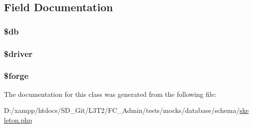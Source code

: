\subsection{Field Documentation}
\hypertarget{class_mock___database___schema___skeleton_a1fa3127fc82f96b1436d871ef02be319}{}
\subsubsection[{\$db}]{\setlength{\rightskip}{0pt plus 5cm}\$db\hspace{0.3cm}{\ttfamily [static]}}\label{class_mock___database___schema___skeleton_a1fa3127fc82f96b1436d871ef02be319}
\hypertarget{class_mock___database___schema___skeleton_a142c9a24d4f80b32faeb93ca6e77f5e3}{}
\subsubsection[{\$driver}]{\setlength{\rightskip}{0pt plus 5cm}\$driver\hspace{0.3cm}{\ttfamily [static]}}\label{class_mock___database___schema___skeleton_a142c9a24d4f80b32faeb93ca6e77f5e3}
\hypertarget{class_mock___database___schema___skeleton_ae30bcdf49d65b81f7ce12940f2f14485}{}
\subsubsection[{\$forge}]{\setlength{\rightskip}{0pt plus 5cm}\$forge\hspace{0.3cm}{\ttfamily [static]}}\label{class_mock___database___schema___skeleton_ae30bcdf49d65b81f7ce12940f2f14485}


The documentation for this class was generated from the following file\+:\begin{DoxyCompactItemize}
\item 
D\+:/xampp/htdocs/\+S\+D\+\_\+\+Git/\+L3\+T2/\+F\+C\+\_\+\+Admin/tests/mocks/database/schema/\hyperlink{skeleton_8php}{skeleton.\+php}\end{DoxyCompactItemize}
